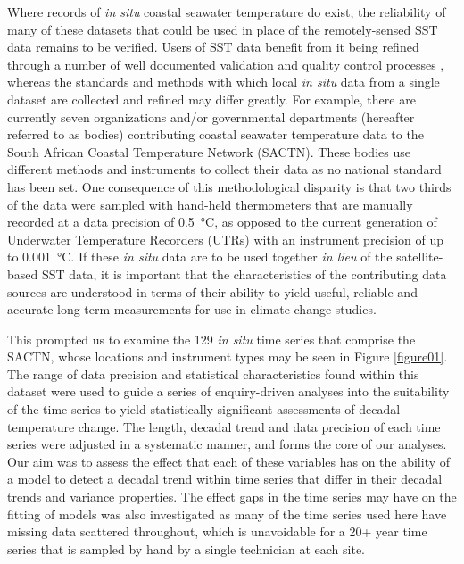 \documentclass{ametsoc}
\begin{document}
Where records of \emph{in situ} coastal seawater temperature do exist, the reliability of many of these datasets that could be used in place of the remotely-sensed SST data remains to be verified. Users of SST data benefit from it being refined through a number of well documented validation and quality control processes \citep[e.g.][]{Reynolds1994, Brown1999, Martin2012}, whereas the standards and methods with which local \emph{in situ} data from a single dataset are collected and refined may differ greatly. For example, there are currently seven organizations and/or governmental departments (hereafter referred to as bodies) contributing coastal seawater temperature data to the South African Coastal Temperature Network (SACTN). These bodies use different methods and instruments to collect their data as no national standard has been set. One consequence of this methodological disparity is that two thirds of the data were sampled with hand-held thermometers that are manually recorded at a data precision of \SI{0.5}{\degreeCelsius}, as opposed to the current generation of Underwater Temperature Recorders (UTRs) with an instrument precision of up to \SI{0.001}{\degreeCelsius}. If these \emph{in situ} data are to be used together \emph{in lieu} of the satellite-based SST data, it is important that the characteristics of the contributing data sources are understood in terms of their ability to yield useful, reliable and accurate long-term measurements for use in climate change studies.

This prompted us to examine the 129 \emph{in situ} time series that comprise the SACTN, whose locations and instrument types may be seen in Figure \ref{figure01}. The range of data precision and statistical characteristics found within this dataset were used to guide a series of enquiry-driven analyses into the suitability of the time series to yield statistically significant assessments of decadal temperature change. The length, decadal trend and data precision of each time series were adjusted in a systematic manner, and forms the core of our analyses. Our aim was to assess the effect that each of these variables has on the ability of a model to detect a decadal trend within time series that differ in their decadal trends and variance properties. The effect gaps in the time series may have on the fitting of models was also investigated as many of the time series used here have missing data scattered throughout, which is unavoidable for a 20+ year time series that is sampled by hand by a single technician at each site.
\end{document}
